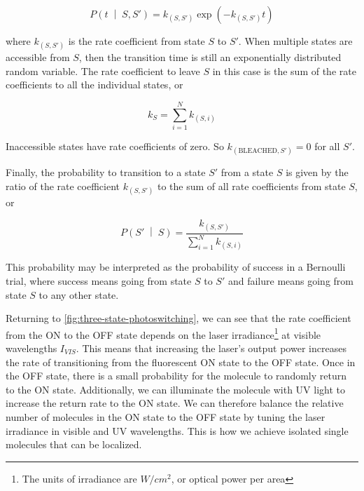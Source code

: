 \documentclass[10pt,a4paper,oneside]{book}
\newcommand{\given}{\;\middle|\;}
\begin{document}
\begin{equation}
    P \left(t \given S, S' \right) = k_{ \left( S, S' \right)} \exp \left( -k_{ \left( S, S' \right) } t \right)
\end{equation}

\noindent where $k_{ \left( S, S' \right)}$ is the rate coefficient from state $S$ to $S'$. When multiple states are accessible from $S$, then the transition time is still an exponentially distributed random variable. The rate coefficient to leave $S$ in this case is the sum of the rate coefficients to all the individual states, or

\begin{equation}
    k_S = \sum_{i = 1}^N k_{ \left( S, i \right) }
\end{equation}

\noindent Inaccessible states have rate coefficients of zero. So $k_{\left( \text{BLEACHED}, S' \right)} = 0$ for all $S'$.

Finally, the probability to transition to a state $S'$ from a state $S$ is given by the ratio of the rate coefficient $k_{ \left( S, S'\right)}$ to the sum of all rate coefficients from state $S$, or

\begin{equation}
    P \left(S' \given S \right) = \frac{k_{\left( S, S' \right)}}{\sum_{i = 1}^N k_{ \left( S, i \right) }}
\end{equation}

\noindent This probability may be interpreted as the probability of success in a Bernoulli trial, where success means going from state $S$ to $S'$ and failure means going from state $S$ to any other state.

Returning to \autoref{fig:three-state-photoswitching}, we can see that the rate coefficient from the ON to the OFF state depends on the laser irradiance\footnote{The units of irradiance are $W / cm^2$, or optical power per area} at visible wavelengths $I_{VIS}$. This means that increasing the laser's output power increases the rate of transitioning from the fluorescent ON state to the OFF state. Once in the OFF state, there is a small probability for the molecule to randomly return to the ON state. Additionally, we can illuminate the molecule with UV light to increase the return rate to the ON state. We can therefore balance the relative number of molecules in the ON state to the OFF state by tuning the laser irradiance in visible and UV wavelengths. This is how we achieve isolated single molecules that can be localized.
\end{document}
